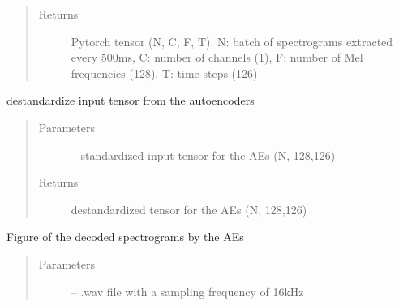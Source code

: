 \documentclass[letterpaper,10pt,english]{sphinxmanual}
\begin{document}
\begin{fulllineitems}
\begin{fulllineitems}
\begin{quote}
\begin{description}
\item[{Returns}] \leavevmode
Pytorch tensor (N, C, F, T). N: batch of spectrograms extracted every 500ms, C: number of channels (1),  F: number of Mel frequencies (128), T: time steps (126)

\end{description}\end{quote}

\end{fulllineitems}


\begin{fulllineitems}
\label{\detokenize{RepLearning:replearning.AEspeech.destandard}}
destandardize input tensor from the autoencoders
\begin{quote}\begin{description}
\item[{Parameters}] \leavevmode
{} -- standardized input tensor for the AEs (N, 128,126)

\item[{Returns}] \leavevmode
destandardized tensor for the AEs (N, 128,126)

\end{description}\end{quote}

\end{fulllineitems}


\begin{fulllineitems}
\label{\detokenize{RepLearning:replearning.AEspeech.plot_spectrograms}}
Figure of the decoded spectrograms by the AEs
\begin{quote}\begin{description}
\item[{Parameters}] \leavevmode
{} -- .wav file with a sampling frequency of 16kHz

\end{description}\end{quote}

\end{fulllineitems}



\end{fulllineitems}
\end{document}
